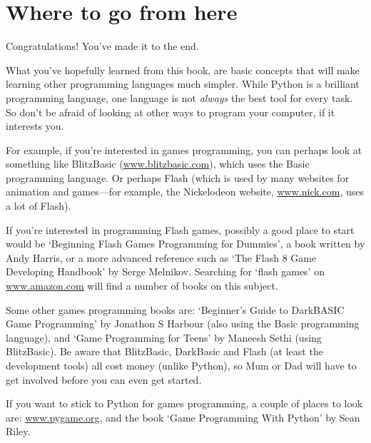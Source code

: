 

\chapter{Where to go from here}

Congratulations! You've made it to the end.
\par
What you've hopefully learned from this book, are basic concepts that will make learning other programming languages much simpler.  While Python is a brilliant programming language, one language is not \emph{always} the best tool for every task.  So don't be afraid of looking at other ways to program your computer, if it interests you.

For example, if you're interested in games programming, you can perhaps look at something like BlitzBasic (\href{http://www.blitzbasic.com}{www.blitzbasic.com}), which uses the Basic programming language. Or perhaps Flash (which is used by many websites for animation and games---for example, the Nickelodeon website, \href{http://www.nick.com}{www.nick.com}, uses a lot of Flash).

If you're interested in programming Flash games, possibly a good place to start would be `Beginning Flash Games Programming for Dummies', a book written by Andy Harris, or a more advanced reference such as `The Flash 8 Game Developing Handbook' by Serge Melnikov.  Searching for `flash games' on \href{http://www.amazon.com}{www.amazon.com} will find a number of books on this subject.

Some other games programming books are: `Beginner's Guide to DarkBASIC Game Programming' by Jonathon S Harbour (also using the Basic programming language), and `Game Programming for Teens' by Maneesh Sethi (using BlitzBasic). Be aware that BlitzBasic, DarkBasic and Flash (at least the development tools) all cost money (unlike Python), so Mum or Dad will have to get involved before you can even get started.

If you want to stick to Python for games programming, a couple of places to look are: \href{http://www.pygame.org}{www.pygame.org}, and the book `Game Programming With Python' by Sean Riley.

